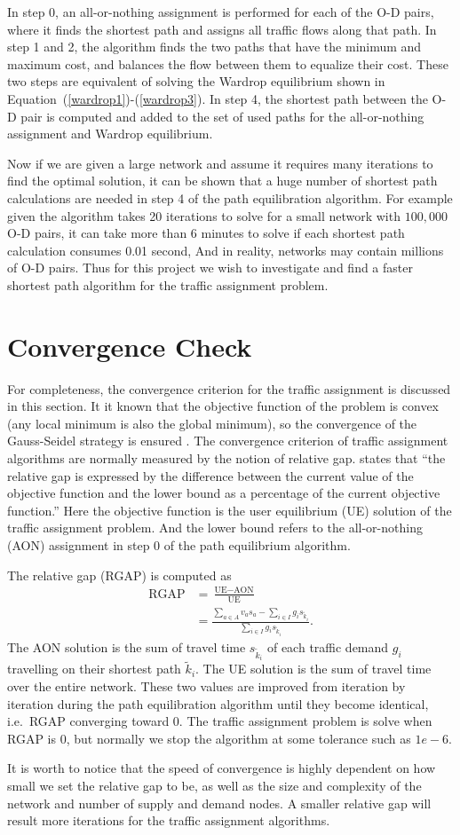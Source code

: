 In step 0, an all-or-nothing assignment is performed for each of the O-D pairs,
where it finds the shortest path and assigns all traffic flows along that path.
In step 1 and 2, the algorithm finds the two paths that have the minimum and maximum cost, and balances the flow between them to equalize their cost.
These two steps are equivalent of solving the Wardrop equilibrium shown in Equation~(\ref{wardrop1})-(\ref{wardrop3}).
In step 4, the shortest path between the O-D pair is computed and added to the set of used paths for the all-or-nothing assignment and Wardrop equilibrium.

Now if we are given a large network and assume it requires many iterations to find the optimal solution,
it can be shown that a huge number of shortest path calculations are needed in step 4 of the path equilibration algorithm.
For example given the algorithm takes 20 iterations to solve for a small network with $100,000$ O-D pairs,
it can take more than 6 minutes to solve if
each shortest path calculation consumes 0.01 second,
And in reality,
networks may contain millions of O-D pairs.
Thus for this project we wish to
investigate and find a faster shortest path algorithm for the traffic assignment problem.

\section{Convergence Check} \label{sec:convergence}

For completeness, the convergence criterion for the traffic assignment is discussed in this section.
It it known that the objective function of the problem is convex (any local minimum is also the global minimum),
so the convergence of the Gauss-Seidel strategy is ensured \citep{Florian2008}.
The convergence criterion of traffic assignment algorithms are normally measured by the notion of relative gap.
\cite{Rose} states that ``the relative gap is expressed by the difference between the current value of 
the objective function and the lower bound as a percentage of the current objective function.''
Here the objective function is the user equilibrium (UE) solution of the traffic assignment problem.
And the lower bound refers to the all-or-nothing (AON) assignment in step 0 of the path equilibrium algorithm.

The relative gap (RGAP) is computed as
\begin{align}
    \text{RGAP} &= \frac{\text{UE} - \text{AON}}{\text{UE}} \\
                &= \frac{\sum_{a \in A} v_a s_a - \sum_{i \in I} g_i s_{\tilde{k}_i}}{\sum_{i \in I} g_i s_{\tilde{k}_i}}.
\end{align}
The AON solution is the sum of travel time $s_{\tilde{k}_i}$ of each traffic demand $g_i$ travelling on their shortest path $\tilde{k}_i$.
The UE solution is the sum of travel time over the entire network.
These two values are improved from iteration by iteration during the path equilibration algorithm until they become identical, i.e.\ RGAP converging toward 0.
The traffic assignment problem is solve when RGAP is 0,
but normally we stop the algorithm at some tolerance such as $1e-6$.

It is worth to notice that the speed of convergence is highly dependent on how small we set the relative gap to be,
as well as the size and complexity of the network and number of supply and demand nodes.
A smaller relative gap will result more iterations for the traffic assignment algorithms.

